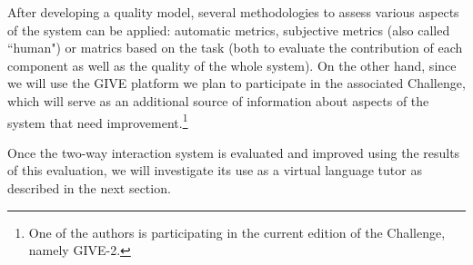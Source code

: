 
After developing a quality model, several methodologies to assess
various aspects of the system can be applied: automatic metrics,
subjective metrics (also called ``human") or matrics based on the task (both to
evaluate the contribution of each component as well as the quality of the whole
system). On the other hand, since we will use the GIVE platform  we plan to
participate in the associated Challenge, which will serve as an additional
source of information about aspects of the system that need
improvement.\footnote{One of the authors is participating in the current
edition of the Challenge, namely GIVE-2.}


Once the two-way interaction system is evaluated and improved using the results
of this evaluation, we will investigate its use as a virtual language tutor as
described in the next section.




